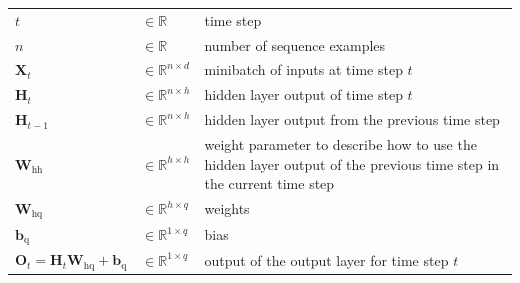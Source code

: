 \begin{customTableWrapper}{1.5}
        \begin{longtable}{l l p{4cm}}
            $t$ & $\in \mathbb{R}$ & time step \\
            
            $n$ & $\in \mathbb{R}$ & number of sequence examples \\
            
            $\mathbf{X}_t$ & $\in \mathbb{R}^{n \times d}$ & minibatch of inputs at time step $t$ \\
        
            \hline
            
            $\mathbf{H}_t$ & $\in \mathbb{R}^{n \times h}$ & hidden layer output of time step $t$ \\
            
            $\mathbf{H}_{t-1}$ & $\in \mathbb{R}^{n \times h}$ & hidden layer output from the previous time step \\
            
            $\mathbf{W}_{\textrm{hh}}$ & $\in \mathbb{R}^{h \times h}$ & weight parameter to describe how to use the hidden layer output of the previous time step in the current time step \\
        
            \hline
        
            $\mathbf{W}_{\textrm{hq}}$ & $\in \mathbb{R}^{h \times q}$ & weights \\
        
            $\mathbf{b}_\textrm{q}$ & $\in \mathbb{R}^{1 \times q}$ & bias \\
        
            $\mathbf{O}_t = \mathbf{H}_t \mathbf{W}_{\textrm{hq}} + \mathbf{b}_\textrm{q}$ & $\in \mathbb{R}^{1 \times q}$ & output of the output layer for time step $t$\\
        
            
        \end{longtable}
        \end{customTableWrapper}

